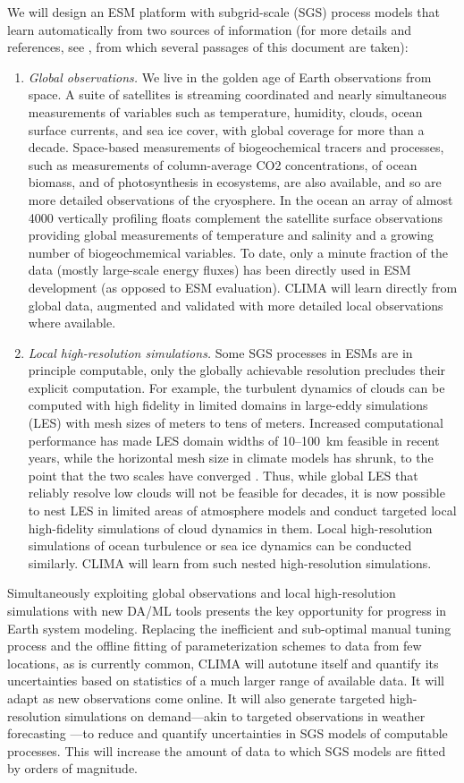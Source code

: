 \documentclass{article}
\begin{document}
We will design an ESM platform with subgrid-scale (SGS) process models that learn automatically from two sources of information (for more details and references, see \citet{Schneider17c}, from which several passages of this document are taken):
\begin{enumerate}
    \item \emph{Global observations.} We live in the golden age of Earth observations from space. A suite of satellites is streaming coordinated and nearly simultaneous measurements of variables such as temperature, humidity, clouds, ocean surface currents, and sea ice cover, with global coverage for more than a decade. Space-based measurements of biogeochemical tracers and processes, such as measurements of column-average CO2 concentrations, of ocean biomass, and of photosynthesis in ecosystems, are also available, and so are more detailed observations of the cryosphere. In the ocean an array of almost 4000 vertically profiling floats complement the satellite surface observations providing global measurements of temperature and salinity and a growing number of biogeochmemical variables. To date, only a minute fraction of the data (mostly large-scale energy fluxes) has been directly used in ESM development (as opposed to ESM evaluation). CLIMA will learn directly from global data, augmented and validated with more detailed local observations where available.
    \item \emph{Local high-resolution simulations.} Some SGS processes in ESMs are in principle computable, only the globally achievable resolution precludes their explicit computation. For example, the turbulent dynamics of clouds can be computed with high fidelity in limited domains in large-eddy simulations (LES) with mesh sizes of meters to tens of meters. Increased computational performance has made LES domain widths of 10--100~km feasible in recent years, while the horizontal mesh size in climate models has shrunk, to the point that the two scales have converged \citep{Schneider17a}. Thus, while global LES that reliably resolve low clouds will not be feasible for decades, it is now possible to nest LES in limited areas of atmosphere models and conduct targeted local high-fidelity simulations of cloud dynamics in them. Local high-resolution simulations of ocean turbulence or sea ice dynamics can be conducted similarly. CLIMA will learn from such nested high-resolution simulations.
\end{enumerate}
Simultaneously exploiting global observations and local high-resolution simulations with new DA/ML tools presents the key opportunity for  progress in Earth system modeling. Replacing the inefficient and sub-optimal manual tuning process and the offline fitting of parameterization schemes to data from few locations, as is currently common, CLIMA will autotune itself and quantify its uncertainties based on statistics of a much larger range of available data. It will adapt as new observations come online. It will also generate targeted high-resolution simulations on demand---akin to targeted observations in weather forecasting \citep{Palmer98a,Lorenz98a}---to reduce and quantify uncertainties in SGS models of computable processes. This will increase the amount of data to which SGS models are fitted by orders of magnitude.
\end{document}
